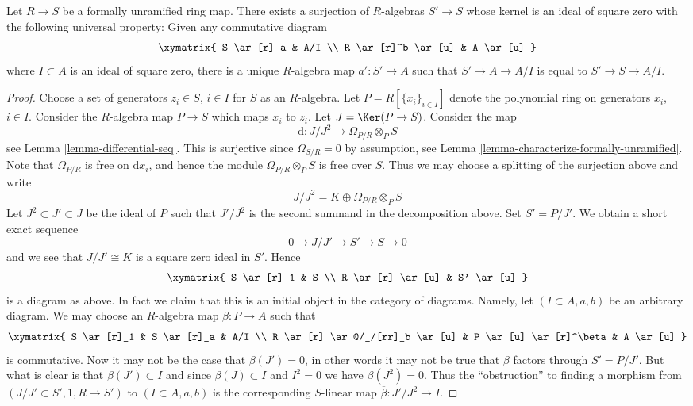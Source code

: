 \begin{lemma}
\label{lemma-universal-thickening}
Let $R \to S$ be a formally unramified ring map. There exists a surjection of
$R$-algebras $S' \to S$ whose kernel is an ideal of square zero with the
following universal property: Given any commutative diagram
$$
\xymatrix{
S \ar[r]_a & A/I \\
R \ar[r]^b \ar[u] & A \ar[u]
}
$$
where $I \subset A$ is an ideal of square zero, there is a unique $R$-algebra
map $a' : S' \to A$ such that $S' \to A \to A/I$ is equal to $S' \to S \to A/I$.
\end{lemma}

\begin{proof}
Choose a set of generators $z_i \in S$, $i \in I$ for $S$ as an $R$-algebra.
Let $P = R[\{x_i\}_{i \in I}]$ denote the polynomial ring on generators
$x_i$, $i \in I$. Consider the $R$-algebra map $P \to S$ which maps
$x_i$ to $z_i$. Let $J = \Ker(P \to S)$. Consider the map
$$
\text{d} : J/J^2 \longrightarrow \Omega_{P/R} \otimes_P S
$$
see
Lemma \ref{lemma-differential-seq}.
This is surjective since $\Omega_{S/R} = 0$ by assumption, see
Lemma \ref{lemma-characterize-formally-unramified}.
Note that $\Omega_{P/R}$ is free on $\text{d}x_i$, and hence the module
$\Omega_{P/R} \otimes_P S$ is free over $S$. Thus we may choose a splitting
of the surjection above and write
$$
J/J^2 = K \oplus \Omega_{P/R} \otimes_P S
$$
Let $J^2 \subset J' \subset J$ be the ideal of $P$ such that
$J'/J^2$ is the second summand in the decomposition above.
Set $S' = P/J'$. We obtain a short exact sequence
$$
0 \to J/J' \to S' \to S \to 0
$$
and we see that $J/J' \cong K$ is a square zero ideal in $S'$. Hence
$$
\xymatrix{
S \ar[r]_1 & S \\
R \ar[r] \ar[u] & S' \ar[u]
}
$$
is a diagram as above. In fact we claim that this is an initial object in
the category of diagrams. Namely, let $(I \subset A, a, b)$ be an arbitrary
diagram. We may choose an $R$-algebra map $\beta : P \to A$ such that
$$
\xymatrix{
S \ar[r]_1 & S \ar[r]_a & A/I \\
R \ar[r] \ar@/_/[rr]_b \ar[u] & P \ar[u] \ar[r]^\beta & A \ar[u]
}
$$
is commutative. Now it may not be the case that $\beta(J') = 0$, in other
words it may not be true that $\beta$ factors through $S' = P/J'$.
But what is clear is that $\beta(J') \subset I$ and
since $\beta(J) \subset I$ and $I^2 = 0$ we have $\beta(J^2) = 0$.
Thus the ``obstruction'' to finding a morphism from
$(J/J' \subset S', 1, R \to S')$ to $(I \subset A, a, b)$ is
the corresponding $S$-linear map $\overline{\beta} : J'/J^2 \to I$.

\end{proof}
